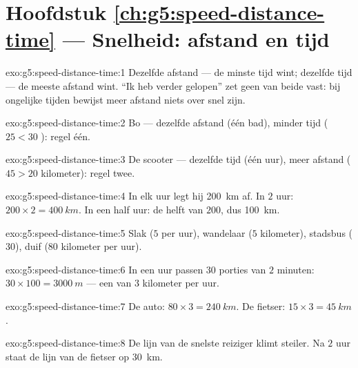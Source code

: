 \section*{Hoofdstuk \ref{ch:g5:speed-distance-time} --- Snelheid: afstand en tijd}

\begin{solution}{exo:g5:speed-distance-time:1}
Dezelfde afstand --- de minste tijd wint; dezelfde tijd --- de meeste
afstand wint. ``Ik heb verder gelopen'' zet geen van beide vast: bij
ongelijke tijden bewijst meer afstand niets over snel zijn.
\end{solution}

\begin{solution}{exo:g5:speed-distance-time:2}
Bo --- dezelfde afstand (één bad), minder tijd ($25 < 30$ ):
regel één.
\end{solution}

\begin{solution}{exo:g5:speed-distance-time:3}
De scooter --- dezelfde tijd (één uur), meer afstand ($45 > 20$
kilometer): regel twee.
\end{solution}

\begin{solution}{exo:g5:speed-distance-time:4}
In elk uur legt hij \qty{200}{km} af. In $2$ uur:
$200 \times 2 = \qty{400}{km}$. In een half uur: de helft van $200$,
dus \qty{100}{km}.
\end{solution}

\begin{solution}{exo:g5:speed-distance-time:5}
Slak ($5$  per uur), wandelaar ($5$ kilometer), stadsbus
($30$), duif ($80$ kilometer per uur).
\end{solution}

\begin{solution}{exo:g5:speed-distance-time:6}
In een uur passen $30$ porties van $2$ minuten: $30 \times 100 =
\qty{3000}{m}$ --- een  van $3$ kilometer per uur.
\end{solution}

\begin{solution}{exo:g5:speed-distance-time:7}
De auto: $80 \times 3 = \qty{240}{km}$. De fietser:
$15 \times 3 = \qty{45}{km}$.
\end{solution}

\begin{solution}{exo:g5:speed-distance-time:8}
De lijn van de snelste reiziger klimt steiler. Na $2$ uur staat de
lijn van de fietser op \qty{30}{km}.
\end{solution}

